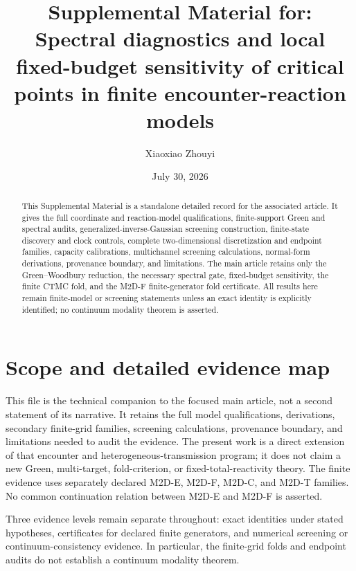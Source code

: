 \documentclass[aps,pre,reprint,amsmath,amssymb,longbibliography,floatfix]{revtex4-2}
\begin{document}
\title{Supplemental Material for: Spectral diagnostics and local fixed-budget sensitivity of critical points in finite encounter-reaction models}

\author{Xiaoxiao Zhouyi}

\date{July 30, 2026}

\begin{abstract}
This Supplemental Material is a standalone detailed record for the associated
article. It gives the full coordinate and reaction-model qualifications,
finite-support Green and spectral audits, generalized-inverse-Gaussian
screening construction, finite-state discovery and clock controls, complete
two-dimensional discretization and endpoint families, capacity calibrations,
multichannel screening calculations, normal-form derivations, provenance
boundary, and limitations. The main article retains only the Green--Woodbury
reduction, the necessary spectral gate, fixed-budget sensitivity, the finite
CTMC fold, and the M2D-F finite-generator fold certificate. All results here
remain finite-model or screening statements unless an exact identity is
explicitly identified; no continuum modality theorem is asserted.
\end{abstract}

\maketitle

\section{Scope and detailed evidence map}
\label{sec:introduction}

This file is the technical companion to the focused main article, not a second
statement of its narrative. It retains the full model qualifications,
derivations, secondary finite-grid families, screening calculations,
provenance boundary, and limitations needed to audit the evidence. The present
work is a direct extension of that encounter and heterogeneous-transmission
program; it does not claim a new Green, multi-target, fold-criterion, or
fixed-total-reactivity theory. The finite evidence uses separately declared
M2D-E, M2D-F, M2D-C, and M2D-T families. No common continuation relation
between M2D-E and M2D-F is asserted.

Three evidence levels remain separate throughout: exact identities under
stated hypotheses, certificates for declared finite generators, and numerical
screening or continuum-consistency evidence. In particular, the finite-grid
folds and endpoint audits do not establish a continuum modality theorem.
\end{document}
